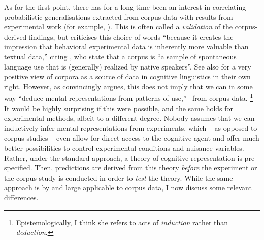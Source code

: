 As for the first point, there has for a long time been an interest in correlating probabilistic generalisations extracted from corpus data with results from experimental work (for example, \citealp{ArppeJaervikivi2007,BresnanEa2007,BresnanFord2010,DivjakGries2008,DivjakEa2016,FordBresnan2013}).
This is often called a \textit{validation} of the corpus-derived findings, but \citet[303]{Divjak2016a} criticises this choice of words ``because it creates the impression that behavioral experimental data is inherently more valuable than textual data,'' citing \cite{TummersEa2005}, who state that a corpus is ``a sample of spontaneous language use that is (generally) realized by native speakers''.
See also \citet{Newman2011} for a very positive view of corpora as a source of data in cognitive linguistics in their own right.
However, as \citet[486--487]{Dabrowska2016} convincingly argues, this does not imply that we can in some way ``deduce mental representations from patterns of use,'' \ie\ from corpus data.%
\footnote{Epistemologically, I think she refers to acts of \textit{induction} rather than \textit{deduction}.}
It would be highly surprising if this were possible, and the same holds for experimental methods, albeit to a different degree.
Nobody assumes that we can inductively infer mental representations from experiments, which -- as opposed to corpus studies -- even allow for direct access to the cognitive agent and offer much better possibilities to control experimental conditions and nuisance variables.
Rather, under the standard approach, a theory of cognitive representation is pre-specified.
Then, predictions are derived from this theory \textit{before} the experiment or the corpus study is conducted in order to \textit{test} the theory.
While the same approach is by and large applicable to corpus data, I now discuss some relevant differences.

